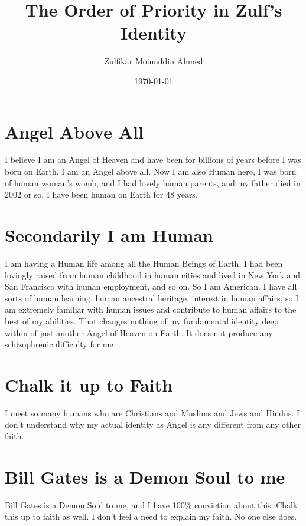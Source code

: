 \documentclass{amsart}
\title{The Order of Priority in Zulf's Identity}
\author{Zulfikar Moinuddin Ahmed}
\date{\today}
\begin{document}
\maketitle

\section{Angel Above All}
I believe I am an Angel of Heaven and have been for billions of years before I was born on Earth.  I am an Angel above all.  Now I am also Human here, I was born of human woman's womb, and I had lovely human parents, and my father died in 2002 or so.  I have been human on Earth for 48 years.  

\section{Secondarily I am Human}

I am having a Human life among all the Human Beings of Earth.  I had been lovingly raised from human childhood in human cities and lived in New York and San Francisco with human employment, and so on.  So I am American.  I have all sorts of human learning, human ancestral heritage, interest in human affairs, so I am extremely familiar with human issues and contribute to human affairs to the best of my abilities.  That changes nothing of my fundamental identity deep within of just another Angel of Heaven on Earth.  It does not produce any schizophrenic difficulty for me

\section{Chalk it up to Faith}

I meet so many humans who are Christians and Muslims and Jews and Hindus.  I don't understand why my actual identity as Angel is any different from any other faith.

\section{Bill Gates is a Demon Soul to me}

Bill Gates is a Demon Soul to me, and I have 100\% conviction about this.  Chalk this up to faith as well.  I don't feel a need to explain my faith.  No one else does.
\end{document}
